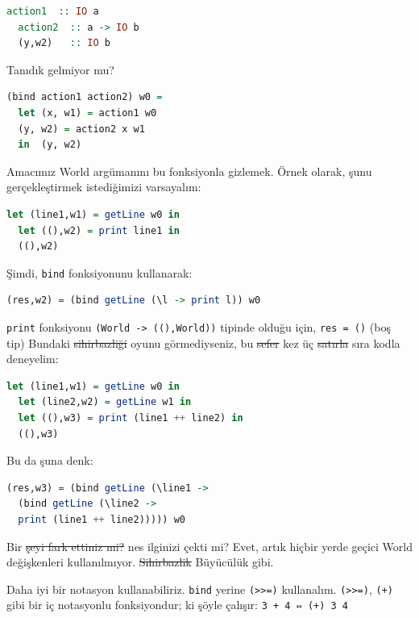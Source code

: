 \documentclass[a4paper,14pt,openany]{extbook} %
\begin{document}
\begin{lstlisting}[language=Haskell]
  action1  :: IO a
  action2  :: a -> IO b
  (y,w2)   :: IO b
\end{lstlisting}

Tanıdık gelmiyor mu?

\begin{lstlisting}[language=Haskell]
  (bind action1 action2) w0 =
  let (x, w1) = action1 w0
  (y, w2) = action2 x w1
  in  (y, w2)
\end{lstlisting}

Amacımız World argümanını bu fonksiyonla gizlemek. Örnek olarak, şunu
gerçekleştirmek istediğimizi varsayalım:

\begin{lstlisting}[language=Haskell]
  let (line1,w1) = getLine w0 in
  let ((),w2) = print line1 in
  ((),w2)
\end{lstlisting}

Şimdi, \lstinline!bind! fonksiyonunu kullanarak:

\begin{lstlisting}[language=Haskell]
  (res,w2) = (bind getLine (\l -> print l)) w0
\end{lstlisting}

\lstinline!print! fonksiyonu \lstinline!(World -> ((),World))! tipinde
olduğu için, \lstinline!res = ()! (boş tip) Bundaki \st{sihirbazliği}
oyunu görmediyseniz, bu \st{sefer} kez üç \st{satırla} sıra kodla deneyelim:

\begin{lstlisting}[language=Haskell]
  let (line1,w1) = getLine w0 in
  let (line2,w2) = getLine w1 in
  let ((),w3) = print (line1 ++ line2) in
  ((),w3)
\end{lstlisting}

Bu da şuna denk:

\begin{lstlisting}[language=Haskell]
  (res,w3) = (bind getLine (\line1 ->
  (bind getLine (\line2 ->
  print (line1 ++ line2))))) w0
\end{lstlisting}

Bir \st{şeyi fark ettiniz mi?} nes ilginizi çekti mi? Evet, artık hiçbir yerde geçici World
değişkenleri kullanılmıyor. \st{Sihirbazlik} Büyücülük gibi.

Daha iyi bir notasyon kullanabiliriz. \lstinline!bind! yerine
\lstinline!(>>=)! kullanalım. \lstinline!(>>=)!, \lstinline!(+)! gibi
bir iç notasyonlu fonksiyondur; ki şöyle çalışır:
\lstinline!3 + 4 ⇔ (+) 3 4!
\end{document}
